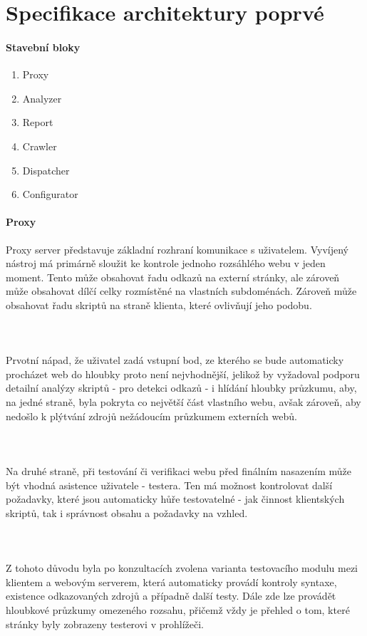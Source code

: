 \documentclass[10pt]{article}
\begin{document}
	\section{Specifikace architektury poprv\'e}
	\paragraph{Stavebn\'i bloky}
	\begin{enumerate}
		\item Proxy
		\item Analyzer
		\item Report
		\item Crawler
		\item Dispatcher
		\item Configurator
	\end{enumerate}
	\paragraph{Proxy} Proxy server představuje základní rozhraní komunikace s uživatelem. Vyvíjený nástroj má primárně sloužit ke kontrole jednoho rozsáhlého webu v jeden moment. Tento může obsahovat řadu odkazů na externí stránky, ale zároveň může obsahovat dílčí celky rozmístěné na vlastních subdoménách. Zároveň může obsahovat řadu skriptů na straně klienta, které ovlivňují jeho podobu.
	\paragraph{~} Prvotní nápad, že uživatel zadá vstupní bod, ze kterého se bude automaticky procházet web do hloubky proto není nejvhodnější, jelikož by vyžadoval podporu detailní analýzy skriptů - pro detekci odkazů - i hlídání hloubky průzkumu, aby, na jedné straně, byla pokryta co největší část vlastního webu, avšak zároveň, aby nedošlo k plýtvání zdrojů nežádoucím průzkumem externích webů.
	\paragraph{~} Na druhé straně, při testování či verifikaci webu před finálním nasazením může být vhodná asistence uživatele - testera. Ten má možnost kontrolovat další požadavky, které jsou automaticky hůře testovatelné - jak činnost klientských skriptů, tak i správnost obsahu a požadavky na vzhled.
	\paragraph{~} Z tohoto důvodu byla po konzultacích zvolena varianta testovacího modulu mezi klientem a webovým serverem, která automaticky provádí kontroly syntaxe, existence odkazovaných zdrojů a případně další testy. Dále zde lze provádět hloubkové průzkumy omezeného rozsahu, přičemž vždy je přehled o tom, které stránky byly zobrazeny testerovi v prohlížeči.
\end{document}
